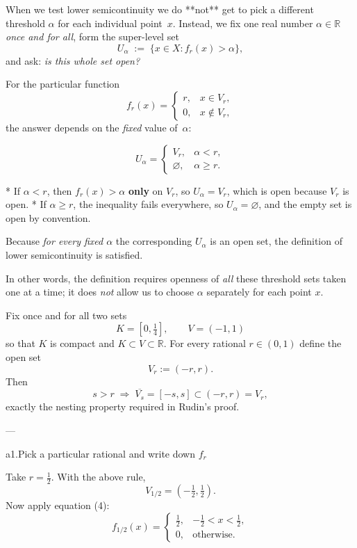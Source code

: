 \documentclass[12pt]{article}
\theoremstyle{definition} %
\theoremstyle{plain} %
\begin{document}
When we test lower semicontinuity we do **not** get to pick
a different threshold $\alpha$ for each individual point~$x$.
Instead, we fix one real number $\alpha\in\mathbb{R}$ \emph{once and
for all}, form the super-level set
\[
    U_\alpha \;:=\;\{x\in X : f_r(x)>\alpha\},
\]
and ask: \emph{is this whole set open?}

For the particular function
\[
    f_r(x)=
    \begin{cases}
         r, & x\in V_r,\\
         0, & x\notin V_r,
    \end{cases}
\]
the answer depends on the \emph{fixed} value of~$\alpha$:

\[
    U_\alpha =
    \begin{cases}
        V_r,          & \alpha<r, \\[6pt]
        \varnothing,  & \alpha\ge r.
    \end{cases}
\]

* If $\alpha<r$, then $f_r(x)>\alpha$ \textbf{only} on $V_r$, so
  $U_\alpha=V_r$, which is open because $V_r$ is open.
* If $\alpha\ge r$, the inequality fails everywhere, so
  $U_\alpha=\varnothing$, and the empty set is open by convention.

Because \emph{for every fixed $\alpha$} the corresponding
$U_\alpha$ is an open set, the definition of lower semicontinuity is
satisfied.

In other words, the definition requires openness of \emph{all} these
threshold sets taken one at a time; it does \emph{not} allow us to
choose $\alpha$ separately for each point $x$.
\pagebreak


Fix once and for all two sets
\[
    K=[0,\tfrac14], 
    \qquad 
    V=(-1,1)
\]
so that $K$ is compact and $K\subset V\subset\mathbb R$.
For every rational $r\in(0,1)$ define the open set
\[
    V_r := (-r,r).
\]
Then
\[
   s>r \;\Longrightarrow\; \overline{V_s}=[-s,s]\subset(-r,r)=V_r,
\]
exactly the nesting property required in Rudin’s proof.

---

a1.\;Pick a particular rational and write down \(f_r\)

Take \(r=\tfrac12\).  
With the above rule,
\[
   V_{1/2}=(-\tfrac12,\tfrac12).
\]
Now apply equation (4):
\[
    f_{1/2}(x)=
    \begin{cases}
        \tfrac12, & -\tfrac12 < x < \tfrac12,\\[4pt]
        0,        & \text{otherwise}.
    \end{cases}
\]
\end{document}

